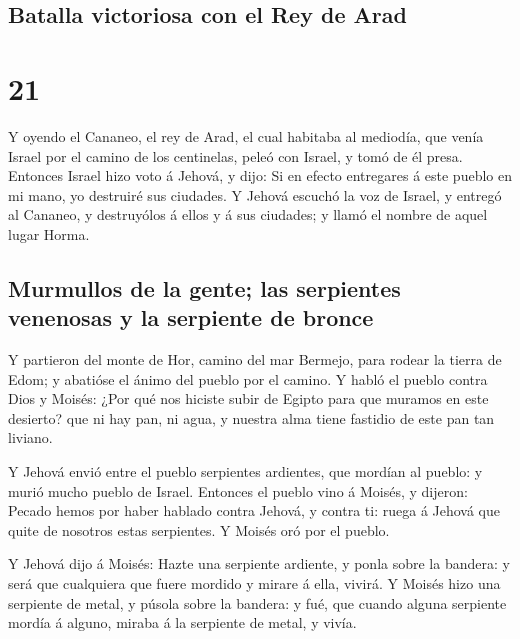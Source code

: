 \hypertarget{batalla-victoriosa-con-el-rey-de-arad}{%
\subsection{Batalla victoriosa con el Rey de
Arad}\label{batalla-victoriosa-con-el-rey-de-arad}}

\hypertarget{section-20}{%
\section{21}\label{section-20}}

 Y oyendo el Cananeo, el rey de Arad, el cual habitaba al
mediodía, que venía Israel por el camino de los centinelas, peleó con
Israel, y tomó de él presa.  Entonces Israel hizo voto á
Jehová, y dijo: Si en efecto entregares á este pueblo en mi mano, yo
destruiré sus ciudades.  Y Jehová escuchó la voz de
Israel, y entregó al Cananeo, y destruyólos á ellos y á sus ciudades; y
llamó el nombre de aquel lugar Horma.

\hypertarget{murmullos-de-la-gente-las-serpientes-venenosas-y-la-serpiente-de-bronce}{%
\subsection{Murmullos de la gente; las serpientes venenosas y la
serpiente de
bronce}\label{murmullos-de-la-gente-las-serpientes-venenosas-y-la-serpiente-de-bronce}}

 Y partieron del monte de Hor, camino del mar Bermejo,
para rodear la tierra de Edom; y abatióse el ánimo del pueblo por el
camino.  Y habló el pueblo contra Dios y Moisés: ¿Por qué
nos hiciste subir de Egipto para que muramos en este desierto? que ni
hay pan, ni agua, y nuestra alma tiene fastidio de este pan tan liviano.

 Y Jehová envió entre el pueblo serpientes ardientes, que
mordían al pueblo: y murió mucho pueblo de Israel. 
Entonces el pueblo vino á Moisés, y dijeron: Pecado hemos por haber
hablado contra Jehová, y contra ti: ruega á Jehová que quite de nosotros
estas serpientes. Y Moisés oró por el pueblo.

 Y Jehová dijo á Moisés: Hazte una serpiente ardiente, y
ponla sobre la bandera: y será que cualquiera que fuere mordido y mirare
á ella, vivirá.  Y Moisés hizo una serpiente de metal, y
púsola sobre la bandera: y fué, que cuando alguna serpiente mordía á
alguno, miraba á la serpiente de metal, y vivía.

